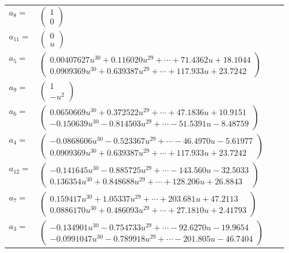 \documentclass[1p]{elsarticle_modified}
\theoremstyle{definition}
\begin{document}
\begin{tabular}{m{7pt} m{180pt} m{7pt} m{180pt} }
\flushright $a_{8}=$&$\begin{pmatrix}1\\0\end{pmatrix}$ \\
\flushright $a_{11}=$&$\begin{pmatrix}0\\u\end{pmatrix}$ \\
\flushright $a_{5}=$&$\begin{pmatrix}0.00407627 u^{30}+0.116020 u^{29}+\cdots+71.4362 u+18.1044\\0.0909369 u^{30}+0.639387 u^{29}+\cdots+117.933 u+23.7242\end{pmatrix}$ \\
\flushright $a_{9}=$&$\begin{pmatrix}1\\- u^2\end{pmatrix}$ \\
\flushright $a_{6}=$&$\begin{pmatrix}0.0650669 u^{30}+0.372522 u^{29}+\cdots+47.1836 u+10.9151\\-0.150639 u^{30}-0.814503 u^{29}+\cdots-51.5391 u-8.48759\end{pmatrix}$ \\
\flushright $a_{4}=$&$\begin{pmatrix}-0.0868606 u^{30}-0.523367 u^{29}+\cdots-46.4970 u-5.61977\\0.0909369 u^{30}+0.639387 u^{29}+\cdots+117.933 u+23.7242\end{pmatrix}$ \\
\flushright $a_{12}=$&$\begin{pmatrix}-0.141645 u^{30}-0.885725 u^{29}+\cdots-143.560 u-32.5033\\0.136354 u^{30}+0.848688 u^{29}+\cdots+128.206 u+26.8843\end{pmatrix}$ \\
\flushright $a_{7}=$&$\begin{pmatrix}0.159417 u^{30}+1.05337 u^{29}+\cdots+203.681 u+47.2113\\0.0886170 u^{30}+0.486093 u^{29}+\cdots+27.1810 u+2.41793\end{pmatrix}$ \\
\flushright $a_{3}=$&$\begin{pmatrix}-0.134901 u^{30}-0.754733 u^{29}+\cdots-92.6270 u-19.9654\\-0.0991047 u^{30}-0.789918 u^{29}+\cdots-201.805 u-46.7404\end{pmatrix}$ \\

\end{tabular}
\end{document}

